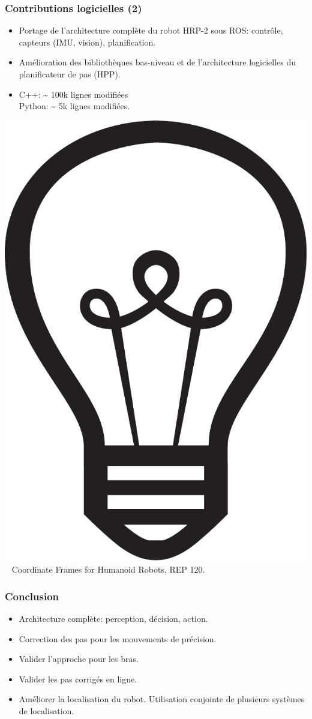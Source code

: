 \documentclass[14pt,utf8,hyperref={pdfpagelabels=false}]{beamer}
\begin{document}
\begin{slidePerception}
  \frametitle{Contributions logicielles (2)}

  \begin{changeleftmargin}{1.1cm}
    \begin{itemize}
      \item Portage de l'architecture complète du robot HRP-2 sous
        ROS: contrôle, capteurs (IMU, vision), planification.
      \item Amélioration des bibliothèques bas-niveau et de
        l'architecture logicielles du planificateur de pas (HPP).
      \item C++: \textasciitilde{} 100k lignes modifiées\\
        Python: \textasciitilde{} 5k lignes
        modifiées.
    \end{itemize}

    \bigskip

    \includegraphics[height=.5cm]{src/slides/idea.pdf}~%
    Coordinate Frames for Humanoid Robots, REP 120.

  \end{changeleftmargin}
\end{slidePerception}



\begin{frame}
  \frametitle{Conclusion}


  \begin{itemize}
  \item Architecture complète: perception, décision, action.
  \item Correction des pas pour les mouvements de précision.
  \end{itemize}

  \bigskip

  \begin{itemize}
  \item Valider l'approche pour les bras.
  \item Valider les pas corrigés en ligne.
  \item Améliorer la localisation du robot. Utilisation conjointe de
    plusieurs systèmes de localisation.
  \end{itemize}
\end{frame}
\end{document}
